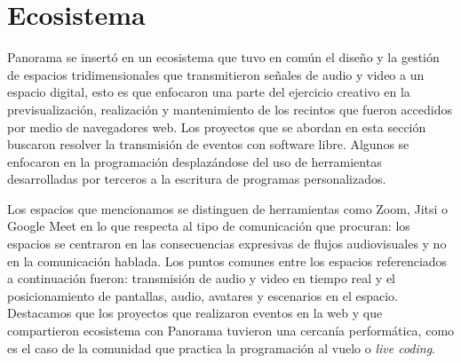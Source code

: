





\section*{Ecosistema}

Panorama se insertó en un ecosistema que tuvo en común el diseño y la gestión de espacios tridimensionales que transmitieron señales de audio y video a un espacio digital, esto es que enfocaron una parte del ejercicio creativo en la previsualización, realización y mantenimiento de los recintos que fueron accedidos por medio de navegadores web. Los proyectos que se abordan en esta sección buscaron resolver la transmisión de eventos con software libre. Algunos se enfocaron en la programación desplazándose del uso de herramientas desarrolladas por terceros a la escritura de programas personalizados. 

Los espacios que mencionamos se distinguen de herramientas como Zoom, Jitsi o Google Meet en lo que respecta al tipo de comunicación que procuran: los espacios se centraron en las consecuencias expresivas de flujos audiovisuales y no en la comunicación hablada. Los puntos comunes entre los espacios referenciados a continuación fueron: transmisión de audio y video en tiempo real y el posicionamiento de pantallas, audio, avatares y escenarios en el espacio. Destacamos que los proyectos que realizaron eventos en la web y que compartieron ecosistema con Panorama tuvieron una cercanía performática, como es el caso de la comunidad que practica la programación al vuelo o \emph{live coding}. 

